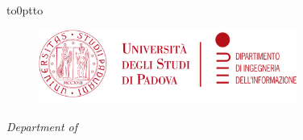 \begin{titlingpage}
	\begin{center}
		\vbox to0pt{\vbox to\vss}
		\vspace{0.3cm}
		\begin{figure}
			\centering
			\vspace{0.2cm}
			\includegraphics[height=2.45cm]{themes/unipd-dei/static/unipd-dei.png}%
		\end{figure}

		{\scshape\Large \UnivName \par}\vspace{0.25cm} %
		\textit{\Large Department of \DeptName}\\
		\vspace{0.25cm} %
		\textbf{\Large \DegreeName}\\[1.6cm] %


\end{center}
\end{titlingpage}
